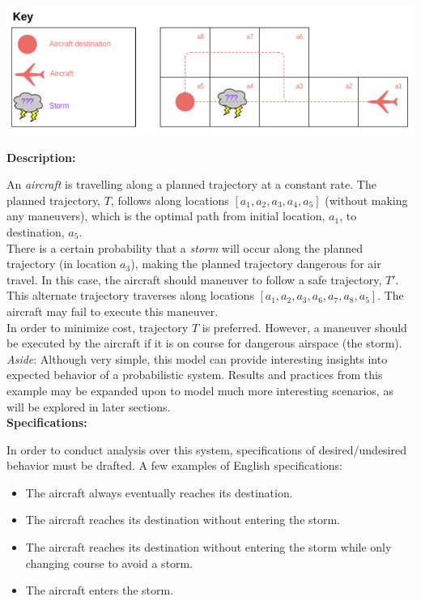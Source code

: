 \documentclass{article}
\begin{document}
\begin{center}
    \includegraphics[scale=.4]{figs/around_the_storm.png}
\end{center}

\textbf{Description:}

An \textit{aircraft} is travelling along a planned trajectory at a constant rate. The planned trajectory, $T$, follows along locations $[a_1,a_2,a_3,a_4,a_5]$ (without making any maneuvers), which is the optimal path from initial location, $a_1$, to destination, $a_5$. \\

There is a certain probability that a \textit{storm} will occur along the planned trajectory (in location $a_3$), making the planned trajectory dangerous for air travel. In this case, the aircraft should maneuver to follow a safe trajectory, $T'$. This alternate trajectory traverses along locations $[a_1,a_2,a_3,a_6,a_7,a_8,a_5]$. The aircraft may fail to execute this maneuver.\\

In order to minimize cost, trajectory $T$ is preferred. However, a maneuver should be executed by the aircraft if it is on course for dangerous airspace (the storm). \\

\textit{Aside}: Although very simple, this model can provide interesting insights into expected behavior of a probabilistic system. Results and practices from this example may be expanded upon to model much more interesting scenarios, as will be explored in later sections. \\


\textbf{Specifications:}

In order to conduct analysis over this system, specifications of desired/undesired behavior must be drafted. A few examples of English specifications:
\begin{itemize}
    \setlength\itemsep{0em}
    \item The aircraft always eventually reaches its destination.

    \item The aircraft reaches its destination without entering the storm.

    \item The aircraft reaches its destination without entering the storm while only changing course to avoid a storm.

    \item The aircraft enters the storm.
\end{itemize}
\end{document}
